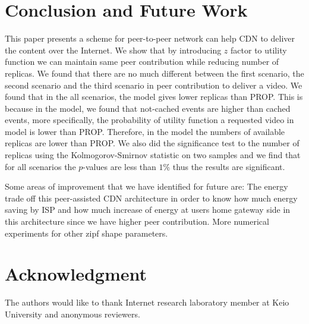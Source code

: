 \documentclass[10pt,final,journal,a4paper]{IEEEtran}
\begin{document}
\section{Conclusion and Future Work}\label{conclusion}
This paper presents a scheme for peer-to-peer network can help CDN to deliver the content over the Internet. 
We show that by introducing $z$ factor to utility function we can maintain same peer contribution while reducing number of replicas.
We found that there are no much different between the first scenario, the second scenario and the third scenario in peer contribution to deliver a video. 
We found that in the all scenarios, the model gives lower replicas than PROP. 
This is because in the model, we found that not-cached events are higher than cached events, more specifically, the probability of utility function a requested video in model is lower than PROP.
Therefore, in the model the numbers of available replicas are lower than PROP. 
We also did the significance test to the number of replicas using the Kolmogorov-Smirnov statistic on two samples and we find that for all scenarios the $p$-values are less than $1$\% thus the results are significant. 

Some areas of improvement that we have identified for future are:
The energy trade off this peer-assisted CDN architecture in order to know how much energy saving by ISP and how much increase of energy at users home gateway side in this architecture since we have higher peer contribution.   
More numerical experiments for other zipf shape parameters. 


\section*{Acknowledgment}
The authors would like to thank Internet research laboratory member at Keio University and anonymous reviewers.







%
%
%



\end{document}
